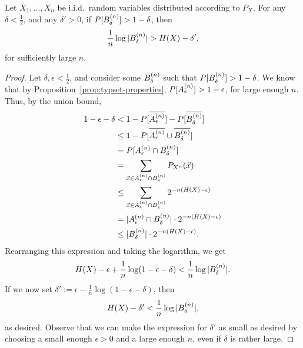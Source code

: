 \begin{theorem}
Let $X_1, ..., X_n$ be i.i.d.\ random variables distributed according to $P_X$. For any $\delta < \frac{1}{2}$, and any $\delta' > 0$, if $P[B_{\delta}^{(n)}] > 1 - \delta$, then
\[
\frac{1}{n} \log |B_{\delta}^{(n)}| > H(X) - \delta',
\]
for sufficiently large $n$.
\end{theorem}
\begin{proof}
Let $\delta,\epsilon < \frac{1}{2}$, and consider some $B_{\delta}^{(n)}$ such that $P[B_{\delta}^{(n)}] > 1 - \delta$. We know that by Proposition~\ref{prop:typset-properties}, $P[A_{\epsilon}^{(n)}] > 1 - \epsilon$, for large enough $n$. Thus, by the union bound,
\begin{align}
1 - \epsilon - \delta &< 1 - P[\overline{A_{\epsilon}^{(n)}}] - P[\overline{B_{\delta}^{(n)}}]\nonumber\\
&\leq 1-P[\overline{A_{\epsilon}^{(n)}} \cup \overline{B_{\delta}^{(n)}}]\nonumber\\
&= P[A_{\epsilon}^{(n)} \cap B_{\delta}^{(n)}]\nonumber\\
&= \sum_{\vec{x} \in A_{\epsilon}^{(n)} \cap B_{\delta}^{(n)}} P_{X^n}(\vec{x})\nonumber\\
&\leq \sum_{\vec{x} \in A_{\epsilon}^{(n)} \cap B_{\delta}^{(n)}} 2^{-n(H(X) - \epsilon)}\nonumber\\
&= |A_{\epsilon}^{(n)} \cap B_{\delta}^{(n)}| \cdot 2^{-n(H(X) - \epsilon)}\nonumber\\
&\leq |B_{\delta}^{(n)}| \cdot 2^{-n(H(X) - \epsilon)}.
\end{align}
Rearranging this expression and taking the logarithm, we get
\begin{align}
H(X) - \epsilon + \frac{1}{n} \log (1 - \epsilon - \delta) < \frac{1}{n} \log |B_{\delta}^{(n)}|.
\end{align}
If we now set $\delta' := \epsilon - \frac{1}{n} \log (1 - \epsilon - \delta)$, then
\begin{align}
H(X) - \delta' < \frac{1}{n} \log |B_{\delta}^{(n)}|,
\end{align}
as desired. Observe that we can make the expression for $\delta'$ as small as desired by choosing a small enough $\epsilon>0$ and a large enough $n$, even if $\delta$ is rather large.
\end{proof}




